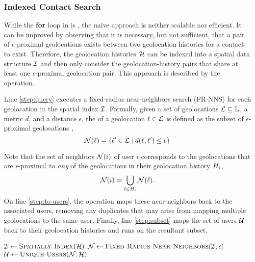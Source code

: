 \subsubsection{Indexed Contact Search}
While the \textbf{for} loop in  is  \cite[p. 14]{Herlihy2012}, the naive approach is neither scalable nor efficient. It can be improved by observing that it is necessary, but not sufficient, that a pair of $\epsilon$-proximal geolocations exists between two geolocation histories for a contact to exist. Therefore, the geolocation histories $\mathcal{H}$ can be indexed into a spatial data structure $\mathcal{I}$ \cite{Mokbel2003, Dinh2010, Mahmood2019} and then only consider the geolocation-history pairs that share at least one $\epsilon$-proximal geolocation pair. This approach is described by the  operation.

Line \ref{step:query} executes a fixed-radius near-neighbors search (FR-NNS) \cite{Bentley1975, Brin1995} for each geolocation in the spatial index $\mathcal{I}$. Formally, given a set of geolocations $\mathcal{L} \subseteq \mathbb{L}$, a metric $d$, and a distance $\epsilon$, the  of a geolocation $\ell \in \mathcal{L}$ is defined as the subset of $\epsilon$-proximal geolocations \cite{Brin1995},
	\begin{equation*}
		\mathcal{N}(\ell) = \{\ell' \in \mathcal{L} \mid d(\ell, \ell') \leq \epsilon\}
	\end{equation*}

Note that the set of neighbors $\mathcal{N}(i)$ of user $i$ corresponds to the geolocations that are $\epsilon$-proximal to \emph{any} of the geolocations in their geolocation history $H_i$,
	\begin{equation*}
		\mathcal{N}(i) = \bigcup_{\ell \in H_i} \mathcal{N}(\ell).
	\end{equation*}
On line \ref{step:to-users}, the operation  maps these near-neighbors back to the associated users, removing any duplicates that may arise from mapping multiple geolocations to the same user. Finally, line \ref{step:subset} maps the set of users $\mathcal{U}$ back to their geolocation histories and runs  on the resultant subset.
\begin{algorithm}[ht!]
\begin{algorithmic}[1]
\State $\sindex \assign \Call{Spatially-Index}{\histories}$
\State $\query \assign \Call{Fixed-Radius-Near-Neighbors}{\sindex, \epsilon}$ \label{step:query}
\State $\users \assign \Call{Unique-Users}{\query, \histories}$ \label{step:to-users}
\State \Return {} \label{step:subset}
\end{algorithmic}
\end{algorithm}

